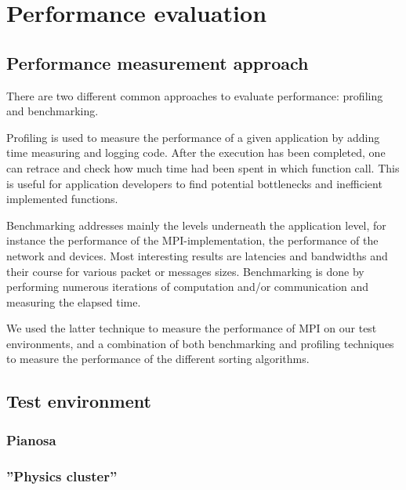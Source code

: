 \section{Performance evaluation}

\subsection{Performance measurement approach}
\label{test-env}
There are two different common approaches to evaluate performance: profiling and benchmarking.

Profiling is used to measure the performance of a given application by adding time measuring and logging code. After the execution has been completed, one can retrace and check how much time had been spent in which function call. This is useful for application developers to find potential bottlenecks and inefficient implemented functions.

Benchmarking addresses mainly the levels underneath the application level, for instance the performance
of the MPI-implementation, the performance of the network and devices. Most interesting results are latencies and bandwidths and their course for various packet or messages sizes. Benchmarking is done by performing numerous iterations of computation and/or communication and measuring the elapsed time.

We used the latter technique to measure the performance of MPI on our test environments, and a combination of both benchmarking and profiling techniques to measure the performance of the different sorting algorithms.

\subsection{Test environment}
\subsubsection{Pianosa}
\subsubsection{''Physics cluster''}

